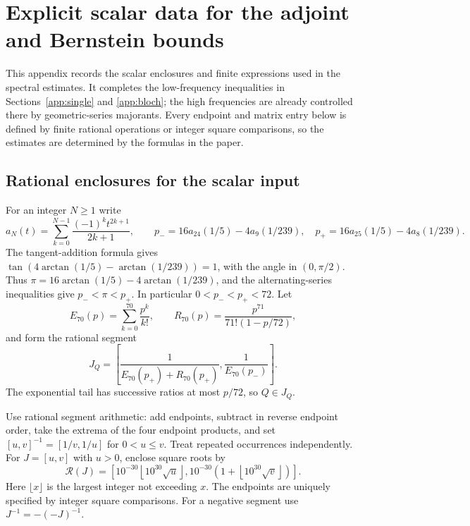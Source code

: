 \section{Explicit scalar data for the adjoint and Bernstein bounds}\label{app:arithmetic}
This appendix records the scalar enclosures and finite expressions used in the spectral estimates. It completes the low-frequency inequalities in Sections~\ref{app:single} and \ref{app:bloch}; the high frequencies are already controlled there by geometric-series majorants. Every endpoint and matrix entry below is defined by finite rational operations or integer square comparisons, so the estimates are determined by the formulas in the paper.

\subsection{Rational enclosures for the scalar input}
For an integer $N\ge1$ write
\[
 a_N(t)=\sum_{k=0}^{N-1}\frac{(-1)^kt^{2k+1}}{2k+1},\qquad
 p_-=16a_{24}(1/5)-4a_9(1/239),\quad
 p_+=16a_{25}(1/5)-4a_8(1/239).
\]
The tangent-addition formula gives $\tan(4\arctan(1/5)-\arctan(1/239))=1$, with the angle in $(0,\pi/2)$. Thus $\pi=16\arctan(1/5)-4\arctan(1/239)$, and the alternating-series inequalities give $p_-<\pi<p_+$. In particular $0<p_-<p_+<72$. Let
\[
 E_{70}(p)=\sum_{k=0}^{70}\frac{p^k}{k!},\qquad
 R_{70}(p)=\frac{p^{71}}{71!(1-p/72)},
\]
and form the rational segment
\begin{equation}\label{eq:fine-Q}
 J_Q=\left[\frac1{E_{70}(p_+)+R_{70}(p_+)},\frac1{E_{70}(p_-)}\right].
\end{equation}
The exponential tail has successive ratios at most $p/72$, so $Q\in J_Q$.

Use rational segment arithmetic: add endpoints, subtract in reverse endpoint order, take the extrema of the four endpoint products, and set $[u,v]^{-1}=[1/v,1/u]$ for $0<u\le v$. Treat repeated occurrences independently. For $J=[u,v]$ with $u>0$, enclose square roots by
\begin{equation}\label{eq:sqrt-envelope}
 \mathcal R(J)=\left[
 10^{-30}\left\lfloor10^{30}\sqrt u\right\rfloor,
 10^{-30}\left(1+\left\lfloor10^{30}\sqrt v\right\rfloor\right)\right].
\end{equation}
Here $\lfloor x\rfloor$ is the largest integer not exceeding $x$. The endpoints are uniquely specified by integer square comparisons. For a negative segment use $J^{-1}=-(-J)^{-1}$.

